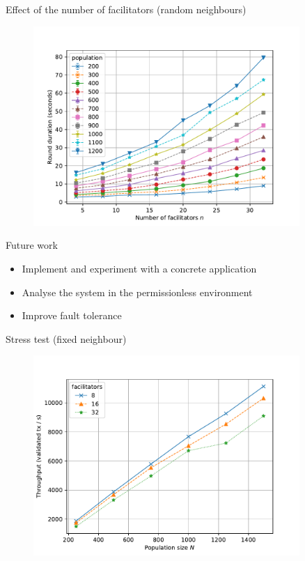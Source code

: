 \documentclass{beamer}
\begin{document}
\begin{frame}[noframenumbering]{Effect of the number of facilitators (random neighbours)}
  \begin{figure}
    \includegraphics[width=0.9\textwidth]{neighbour-random/round-duration-vs-facilitators}
    \centering
  \end{figure}
\end{frame}

\begin{frame}[noframenumbering]{Future work}
\begin{itemize}
\item Implement and experiment with a concrete application
\item Analyse the system in the permissionless environment
\item Improve fault tolerance
\end{itemize}
\end{frame}

\begin{frame}{Stress test (fixed neighbour)}
  \begin{figure}[h]
  \includegraphics[width=0.9\textwidth]{throughput-vs-population-large}
  \centering
  \end{figure}
\end{frame}
\end{document}
